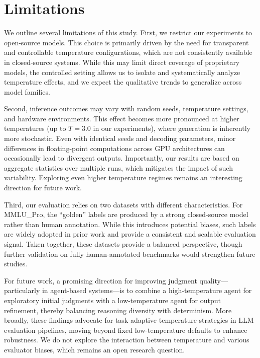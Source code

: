 \documentclass[11pt]{article}
\begin{document}
\section{Limitations}

We outline several limitations of this study. First, we restrict our experiments to open-source models. This choice is primarily driven by the need for transparent and controllable temperature configurations, which are not consistently available in closed-source systems. While this may limit direct coverage of proprietary models, the controlled setting allows us to isolate and systematically analyze temperature effects, and we expect the qualitative trends to generalize across model families.

Second, inference outcomes may vary with random seeds, temperature settings, and hardware environments. This effect becomes more pronounced at higher temperatures (up to \(T = 3.0\) in our experiments), where generation is inherently more stochastic. Even with identical seeds and decoding parameters, minor differences in floating-point computations across GPU architectures can occasionally lead to divergent outputs. Importantly, our results are based on aggregate statistics over multiple runs, which mitigates the impact of such variability. Exploring even higher temperature regimes remains an interesting direction for future work.

Third, our evaluation relies on two datasets with different characteristics. For MMLU\_Pro, the ``golden'' labels are produced by a strong closed-source model rather than human annotation. While this introduces potential biases, such labels are widely adopted in prior work and provide a consistent and scalable evaluation signal. Taken together, these datasets provide a balanced perspective, though further validation on fully human-annotated benchmarks would strengthen future studies.

For future work, a promising direction for improving judgment quality—particularly in agent-based systems—is to combine a high-temperature agent for exploratory initial judgments with a low-temperature agent for output refinement, thereby balancing reasoning diversity with determinism. More broadly, these findings advocate for task-adaptive temperature strategies in LLM evaluation pipelines, moving beyond fixed low-temperature defaults to enhance robustness. We do not explore the interaction between temperature and various evaluator biases, which remains an open research question.
\end{document}
